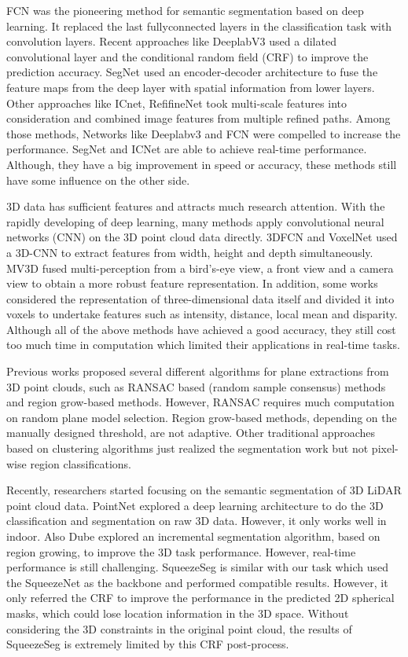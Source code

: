 \documentclass[final]{cvpr}
\begin{document}
FCN\cite{6} was the pioneering method for semantic segmentation based on deep learning. It replaced the last fullyconnected layers in the classification task with convolution layers. Recent approaches like DeeplabV3\cite{7} used a dilated convolutional layer\cite{8} and the conditional random field (CRF)\cite{9} to improve the prediction accuracy. SegNet\cite{10} used an encoder-decoder architecture to fuse the feature maps from the deep layer with spatial information from lower layers. Other approaches like ICnet\cite{11}, RefifineNet\cite{12} took multi-scale features into consideration and combined image features from multiple refined paths. Among those methods, Networks like Deeplabv3 and FCN were compelled to increase the performance. SegNet and ICNet are able to achieve real-time performance. Although, they have a big improvement in speed or accuracy, these methods still have some influence on the other side\cite{4}. 

3D data has sufficient features and attracts much research attention. With the rapidly developing of deep learning, many methods apply convolutional neural networks (CNN) on the 3D point cloud data directly. 3DFCN\cite{13} and VoxelNet\cite{14} used a 3D-CNN\cite{15} to extract features from width, height and depth simultaneously. MV3D\cite{16} fused multi-perception from a bird’s-eye view, a front view and a camera view to obtain a more robust feature representation. In addition, some works\cite{17} considered the representation of three-dimensional data itself and divided it into voxels to undertake features such as intensity, distance, local mean and disparity. Although all of the above methods have achieved a good accuracy, they still cost too much time in computation which limited their applications in real-time tasks\cite{2018PointSeg}.

Previous works proposed several different algorithms for plane extractions from 3D point clouds, such as RANSAC based (random sample consensus)\cite{18} methods and region grow-based methods\cite{19}. However, RANSAC requires much computation on random plane model selection. Region grow-based methods, depending on the manually designed threshold, are not adaptive. Other traditional approaches based on clustering algorithms just realized the segmentation work but not pixel-wise region classifications\cite{2018PointSeg}. 

Recently, researchers started focusing on the semantic segmentation of 3D LiDAR point cloud data. PointNet\cite{35} explored a deep learning architecture to do the 3D classification and segmentation on raw 3D data. However, it only works well in indoor. Also Dube\cite{21} explored an incremental segmentation algorithm, based on region growing, to improve the 3D task performance. However, real-time performance is still challenging. SqueezeSeg\cite{4} is similar with our task which used the SqueezeNet\cite{3} as the backbone and performed compatible results. However, it only referred the CRF to improve the performance in the predicted 2D spherical masks, which could lose location information in the 3D space. Without considering the 3D constraints in the original point cloud, the results of SqueezeSeg is extremely limited by this CRF post-process\cite{2018PointSeg}. 
\end{document}
